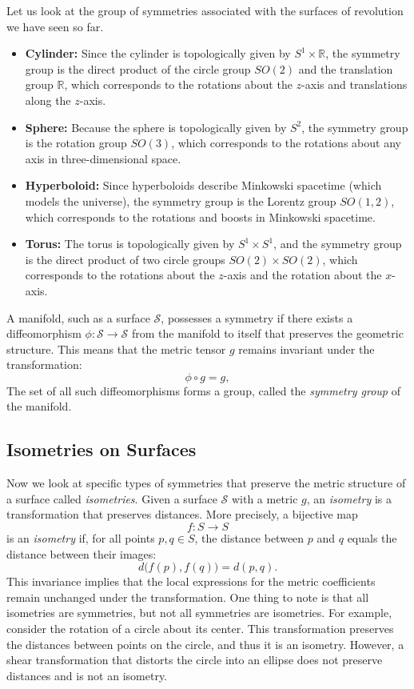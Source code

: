 \documentclass[12pt]{article}
\begin{document}
Let us look at the group of symmetries associated with the surfaces of revolution we have seen so far.
\begin{itemize}
	\item \textbf{Cylinder:} Since the cylinder is topologically given by $S^1 \times \mathbb{R}$, the symmetry group is the direct product of the circle group $SO(2)$ and the translation group $\mathbb{R}$, which corresponds to the rotations about the $z$-axis and translations along the $z$-axis.
	\item \textbf{Sphere:} Because the sphere is topologically given by $S^2$, the symmetry group is the rotation group $SO(3)$, which corresponds to the rotations about any axis in three-dimensional space.
	\item \textbf{Hyperboloid:} Since hyperboloids describe Minkowski spacetime (which models the universe), the symmetry group is the Lorentz group $SO(1,2)$, which corresponds to the rotations and boosts in Minkowski spacetime.
	\item \textbf{Torus:} The torus is topologically given by $S^1 \times S^1$, and the symmetry group is the direct product of two circle groups $SO(2) \times SO(2)$, which corresponds to the rotations about the $z$-axis and the rotation about the $x$-axis.
\end{itemize}

A manifold, such as a surface $\mathcal{S}$, possesses a symmetry if there exists a diffeomorphism $\phi: \mathcal{S} \to \mathcal{S}$ from the manifold to itself that preserves the geometric structure.
This means that the metric tensor $g$ remains invariant under the transformation:
\[
	\phi \circ g = g,
\]
The set of all such diffeomorphisms forms a group, called the \emph{symmetry group} of the manifold.

\subsection{Isometries on Surfaces}
Now we look at specific types of symmetries that preserve the metric structure of a surface called \emph{isometries}.
Given a surface $\mathcal{S}$ with a metric $g$, an \emph{isometry} is a transformation that preserves distances. More precisely, a bijective map
\[
f: S \to S
\]
is an \emph{isometry} if, for all points $p,q\in S$, the distance between $p$ and $q$ equals the distance between their images:
\[
d\big(f(p),f(q)\big)=d(p,q).
\]
This invariance implies that the local expressions for the metric coefficients remain unchanged under the transformation. 
One thing to note is that all isometries are symmetries, but not all symmetries are isometries.
For example, consider the rotation of a circle about its center. This transformation preserves the distances between points on the circle, and thus it is an isometry.
However, a shear transformation that distorts the circle into an ellipse does not preserve distances and is not an isometry.
\end{document}
